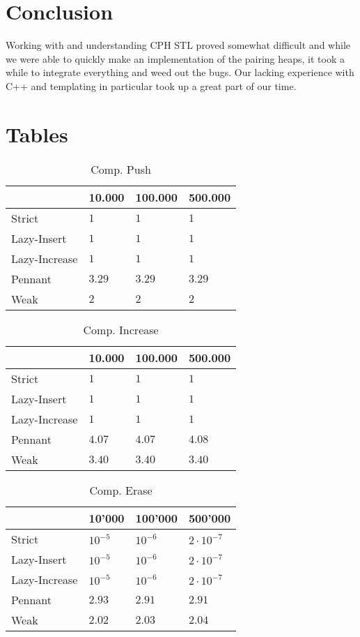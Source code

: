 \documentclass{DIKU-article}[2010/01/13]
\begin{document}
\section{Conclusion}

Working with and understanding CPH STL proved somewhat difficult and
while we were able to quickly make an implementation of the pairing
heaps, it took a while to integrate everything and weed out the
bugs. Our lacking experience with C++ and templating in particular
took up a great part of our time.





\newpage
\appendix


\section{Tables}
\begin{table}[h!]
\centering
\caption{Comp. Push}
\begin{tabular}{l|lll}
\label{tab:comp.first}
 & 10.000 & 100.000 & 500.000 \\
\hline
Strict & $1$ & $1$ & $1$ \\
Lazy-Insert & $1$ & $1$ & $1$ \\
Lazy-Increase & $1$ & $1$ & $1$ \\
Pennant & $3.29$ & $3.29$ & $3.29$ \\
Weak & $2$ & $2$ & $2$

\end{tabular}
\end{table}

\begin{table}[h!]
\centering
\caption{Comp. Increase}
\begin{tabular}{l|lll}
 & 10.000 & 100.000 & 500.000 \\
\hline
Strict & $1$ & $1$ & $1$ \\
Lazy-Insert & $1$ & $1$ & $1$ \\
Lazy-Increase & $1$ & $1$ & $1$ \\
Pennant & $4.07$ & $4.07$ & $4.08$ \\
Weak & $3.40$ & $3.40$ & $3.40$

\end{tabular}
\end{table}

\begin{table}[h!]
\centering
\caption{Comp. Erase}
\begin{tabular}{l|lll}
 & 10'000 & 100'000 & 500'000 \\
\hline
Strict & $10^{-5}$ & $10^{-6}$ & $2\cdot 10^{-7}$ \\
Lazy-Insert & $10^{-5}$ & $10^{-6}$ & $2\cdot 10^{-7}$ \\
Lazy-Increase & $10^{-5}$ & $10^{-6}$ & $2\cdot 10^{-7}$ \\
Pennant & $2.93$ & $2.91$ & $2.91$ \\
Weak & $2.02$ & $2.03$ & $2.04$

\end{tabular}
\end{table}
\end{document}
